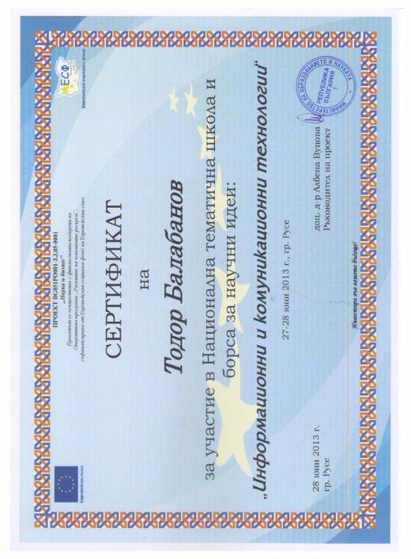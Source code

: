 \documentclass[bulgarian,a4paper]{europasscv}
\begin{document}
\includegraphics[width=\textwidth,height=\textheight,keepaspectratio]{Rouse2013}
\end{document}
